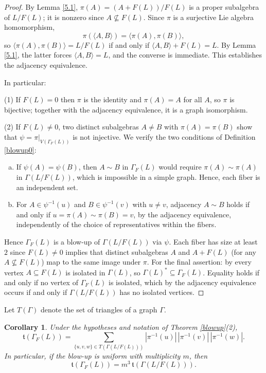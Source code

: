 \documentclass[11pt]{amsart}
\theoremstyle{plain}
\newtheorem{corollary}[theorem]{Corollary}
\begin{document}
\begin{proof}
By Lemma \ref{5.1}, $\pi(A) = (A+F(L))/F(L)$ is a proper
subalgebra of $L/F(L)$; it is nonzero since $A \not\subseteq F(L)$. Since
$\pi$ is a surjective Lie algebra homomorphism,
\[\pi(\langle A, B \rangle) = \langle \pi(A), \pi(B) \rangle,\]
so $\langle \pi(A), \pi(B) \rangle = L/F(L)$ if and only if $\langle A, B
\rangle + F(L) = L$. By Lemma \ref{5.1}, the latter forces
$\langle A, B \rangle = L$, and the converse is immediate. This establishes
the adjacency equivalence.

In particular:

\noindent (1) If $F(L) = 0$ then $\pi$ is the identity and $\pi(A) = A$ for all $A$, so $\pi$ is bijective; together with the adjacency equivalence, it is a graph isomorphism.

\noindent (2) If $F(L) \neq 0$, two distinct subalgebras $A \neq B$ with $\pi(A) = \pi(B)$ show that $\psi = \pi|_{V(\Gamma_F(L))}$ is not injective. We verify the two conditions of Definition \ref{blowup0}:
\begin{enumerate}[(a)]
\item If $\psi(A) = \psi(B)$, then $A \sim B$ in $\Gamma_F(L)$ would require
$\pi(A) \sim \pi(A)$ in $\Gamma(L/F(L))$, which is impossible in a simple graph. Hence, each fiber is an independent set.

\item For $A \in \psi^{-1}(u)$ and $B \in \psi^{-1}(v)$ with $u \neq v$, adjacency $A \sim B$ holds if and only if $u = \pi(A) \sim \pi(B) = v$, by the adjacency equivalence, independently of the choice of representatives within the fibers.
\end{enumerate}
Hence $\Gamma_F(L)$ is a blow-up of $\Gamma(L/F(L))$ via $\psi$. Each fiber
has size at least $2$ since $F(L) \neq 0$ implies that distinct subalgebras
$A$ and $A + F(L)$ (for any $A \not\subseteq F(L)$) map to the same image
under $\pi$. For the final assertion: by \cite[Lemma 3.2]{TZG} every
vertex $A \subseteq F(L)$ is isolated in $\Gamma(L)$, so $\Gamma(L)^*
\subseteq \Gamma_F(L)$. Equality holds if and only if no vertex of
$\Gamma_F(L)$ is isolated, which by the adjacency equivalence occurs if and
only if $\Gamma(L/F(L))$ has no isolated vertices.
\end{proof}

Let $T(\Gamma)$ denote the set of triangles of a graph $\Gamma$. 

\begin{corollary}\label{triangle-blowup}
Under the hypotheses and notation of Theorem \ref{blowup}(2),
\[\mathfrak{t}(\Gamma_F(L)) = \sum_{\{u,v,w\} \in T(\Gamma(L/F(L)))}
|\pi^{-1}(u)|\,|\pi^{-1}(v)|\,|\pi^{-1}(w)|.\]
In particular, if the blow-up is uniform with multiplicity $m$, then 
\[ \mathfrak{t}(\Gamma_F(L)) = m^3 \, \mathfrak{t}(\Gamma(L/F(L))).\]
\end{corollary}
\end{document}
